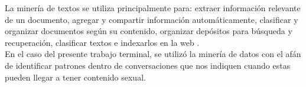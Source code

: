 La miner\'ia de textos se utiliza principalmente para: extraer informaci\'on relevante de un documento, agregar y compartir informaci\'on autom\'aticamente, clasificar y organizar documentos seg\'un su contenido, organizar dep\'ositos para b\'usqueda y recuperaci\'on, clasificar textos e indexarlos en la web \cite{min3}.  \\

En el caso del presente trabajo terminal, se utiliz\'o la miner\'ia de datos con el af\'an de identificar patrones dentro de conversaciones que nos indiquen cuando estas pueden llegar a tener contenido sexual. 

\pagebreak




